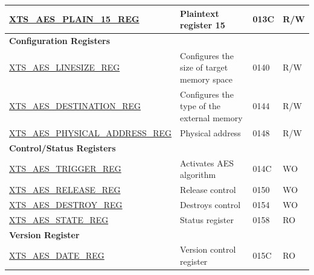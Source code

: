 \begin{longtable}{ | p{6cm} | p{7.2cm} | p{1.3cm} | p{1cm} | }
\hyperref[regdesc:XTSAESPLAINNREG]{XTS\_AES\_PLAIN\_15\_REG} & Plaintext register 15 & \hexprefix{}013C & R/W \\ \hline
\multicolumn{4}{|l|}{\textbf{Configuration Registers}} \\ \hline
\hyperref[regdesc:XTSAESLINESIZEREG]{XTS\_AES\_LINESIZE\_REG} & Configures the size of target memory space & \hexprefix{}0140 & R/W \\ \hline
\hyperref[regdesc:XTSAESDESTINATIONREG]{XTS\_AES\_DESTINATION\_REG} & Configures the type of the external memory & \hexprefix{}0144 & R/W \\ \hline
\hyperref[regdesc:XTSAESPHYSICALADDRESSREG]{XTS\_AES\_PHYSICAL\_ADDRESS\_REG} & Physical address & \hexprefix{}0148 & R/W \\ \hline
\multicolumn{4}{|l|}{\textbf{Control/Status Registers}} \\ \hline
\hyperref[regdesc:XTSAESTRIGGERREG]{XTS\_AES\_TRIGGER\_REG} & Activates AES algorithm & \hexprefix{}014C & WO \\ \hline
\hyperref[regdesc:XTSAESRELEASEREG]{XTS\_AES\_RELEASE\_REG} & Release control & \hexprefix{}0150 & WO \\ \hline
\hyperref[regdesc:XTSAESDESTROYREG]{XTS\_AES\_DESTROY\_REG} & Destroys control & \hexprefix{}0154 & WO \\ \hline
\hyperref[regdesc:XTSAESSTATEREG]{XTS\_AES\_STATE\_REG} & Status register & \hexprefix{}0158 & RO \\ \hline
\multicolumn{4}{|l|}{\textbf{Version Register}} \\ \hline
\hyperref[regdesc:XTSAESDATEREG]{XTS\_AES\_DATE\_REG} & Version control register & \hexprefix{}015C & RO \\ \hline
\end{longtable}
